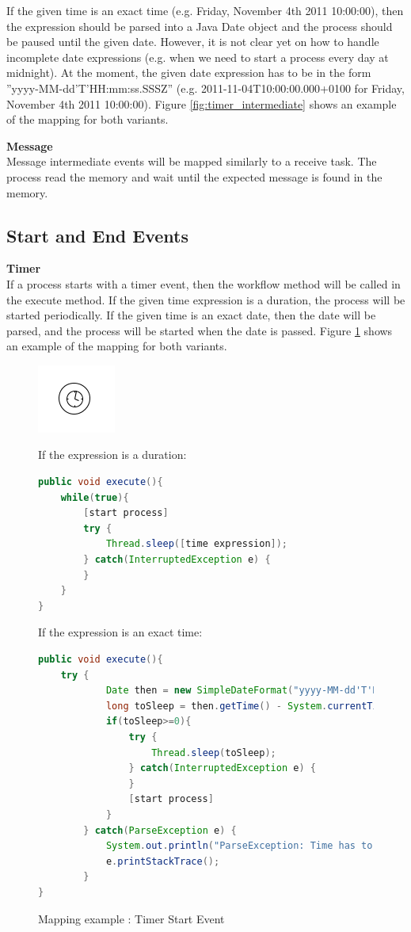 If the given time is an exact time (e.g. Friday, November 4th 2011 10:00:00), then the expression should be parsed into a Java Date object and the process should be paused until the given date. However, it is not clear yet on how to handle incomplete date expressions (e.g. when we need to start a process every day at midnight). At the moment, the given date expression has to be in the form ''yyyy-MM-dd'T'HH:mm:ss.SSSZ'' (e.g. 2011-11-04T10:00:00.000+0100 for Friday, November 4th 2011 10:00:00). Figure \ref{fig:timer_intermediate}
shows an example of the mapping for both variants.

\textbf{Message}\\
Message intermediate events will be mapped similarly to a receive task. The process read the memory and wait until the expected message is found in the memory. 

\subsection{Start and End Events}

\textbf{Timer}\\
If a process starts with a timer event, then the workflow method will be called in the execute method. If the given time expression is a duration, the process will be started periodically. If the given time is an exact date, then the date will be parsed, and the process will be started when the date is passed. Figure \ref{fig:timer_start} shows an example of the mapping for both variants.

\begin{figure}[h]
\begin{minipage}[c]{0.28\textwidth}
\includegraphics{images/mapping/timer_start.png}
\end{minipage}
\begin{minipage}[c]{0.72\textwidth}
If the expression is a duration:
\begin{lstlisting}[language = Java]
public void execute(){
	while(true){
		[start process]
		try {
			Thread.sleep([time expression]);
		} catch(InterruptedException e) {
		}
	}
}
\end{lstlisting}
If the expression is an exact time:
\begin{lstlisting}[language = Java]
public void execute(){
	try {
			Date then = new SimpleDateFormat("yyyy-MM-dd'T'HH:mm:ss.SSSZ").parse("2011-11-04T10:00:00.000+0100");
			long toSleep = then.getTime() - System.currentTimeMillis();
			if(toSleep>=0){
				try {
					Thread.sleep(toSleep);
				} catch(InterruptedException e) {
				}
				[start process]
			}
		} catch(ParseException e) {
			System.out.println("ParseException: Time has to be in yyyy-MM-dd'T'HH:mm:ss.SSSZ form");
			e.printStackTrace();
		}
}
\end{lstlisting}
\end{minipage}
\caption{Mapping example : Timer Start Event}%
\label{fig:timer_start}%
\end{figure}


